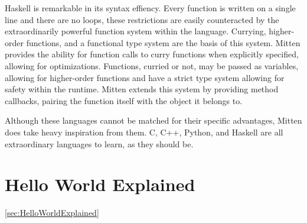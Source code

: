 \documentclass[10pt,a4paper]{article}
\begin{document}
Haskell is remarkable in its syntax effiency. Every function is written on a single line and there are no loops, these restrictions are easily counteracted by the extraordinarily powerful function system within the language. Currying, higher-order functions, and a functional type system are the basis of this system. Mitten provides the ability for function calls to curry functions when explicitly specified, allowing for optimizations. Functions, curried or not, may be passed as variables, allowing for higher-order functions and have a strict type system allowing for safety within the runtime. Mitten extends this system by providing method callbacks, pairing the function itself with the object it belongs to.

Although these languages cannot be matched for their specific advantages, Mitten does take heavy inspiration from them. C, C++, Python, and Haskell are all extraordinary languages to learn, as they should be.

\section{Hello World Explained}
\ref{sec:HelloWorldExplained}
\end{document}
